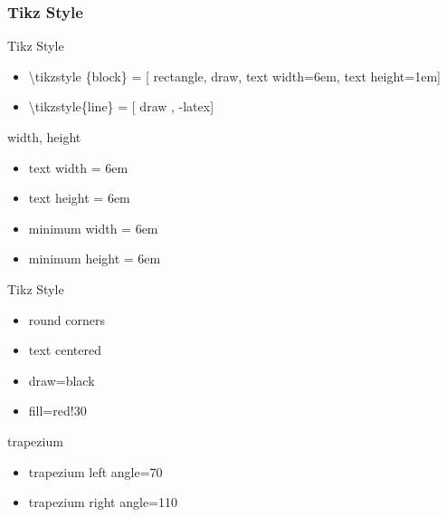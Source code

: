 \documentclass[ aspectratio=169,  12pt,blue,xcolor=pdftex,dvipsnames,table,handout,notes]{beamer}
\begin{document}













		\begin{frame}[t]
		\frametitle{Tikz Style}

			\begin{block}{Tikz Style}
			\begin{itemize}
			\item[] 	\textbackslash tikzstyle \{block\} = [ rectangle, draw, text width=6em, text height=1em]
			\item[] 	\textbackslash tikzstyle\{line\} = [ draw , -latex]
			\end{itemize}
			\end{block}


			\begin{block}{width, height}
			\begin{itemize}
			\item[] 	text width = 6em
			\item[] 	text height = 6em
			\item[] 	minimum width = 6em
			\item[] 	minimum height = 6em
			\end{itemize}
			\end{block}



	

			\begin{block}{Tikz Style}
			\begin{itemize}
			\item[] 	round corners
			\item[] 	text centered
			\item[] 	draw=black
			\item[] 	fill=red!30
			\end{itemize}
			\end{block}


	


	
			\begin{block}{trapezium}
			\begin{itemize}
			\item[] 	trapezium left angle=70
			\item[] 	trapezium right angle=110
			\end{itemize}
			\end{block}


		\end{frame}
\end{document}

